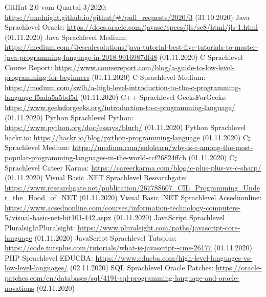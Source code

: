 \documentclass[ngerman]{article}
\begin{document}
\begin{thebibliography}{9}
        GitHut 2.0 vom Quartal 3/2020: \url{https://madnight.github.io/githut/#/pull_requests/2020/3} (31.10.2020)
        Java Sprachlevel Oracle: \url{https://docs.oracle.com/javase/specs/jls/se8/html/jls-1.html} (01.11.2020)
        Java Sprachlevel Medium: \url{https://medium.com/@escalesolutions/java-tutorial-best-five-tutorials-to-master-java-programming-language-in-2018-9916987df48} (01.11.2020)
        C Sprachlevel Course Report: \url{https://www.coursereport.com/blog/a-guide-to-low-level-programming-for-beginners} (01.11.2020)
        C Sprachlevel Medium: \url{https://medium.com/swlh/a-high-level-introduction-to-the-c-programming-language-f5ada5a5bd5d} (01.11.2020)
        C++ Sprachlevel GeeksForGeeks: \url{https://www.geeksforgeeks.org/introduction-to-c-programming-language/} (01.11.2020)
        Python Sprachlevel Python: \url{https://www.python.org/doc/essays/blurb/} (01.11.2020)
        Python Sprachlevel hackr.io: \url{https://hackr.io/blog/python-programming-language} (01.11.2020)
        C$\sharp$ Sprachlevel Medium: \url{https://medium.com/sololearn/why-is-c-among-the-most-popular-programming-languages-in-the-world-ccf26824ffcb} (01.11.2020)
        C$\sharp$ Sprachlevel Cateer Karma: \url{https://careerkarma.com/blog/c-plus-plus-vs-c-sharp/} (01.11.2020)
        Visual Basic .NET Sprachlevel Researchgate: \url{https://www.researchgate.net/publication/267788607_CIL_Programming_Under_the_Hood_of_NET} (01.11.2020)
        Visual Basic .NET Sprachlevel Acseduonline: \url{https://www.acseduonline.com/courses/information-technology-computers-5/visual-basic-net-bit101-442.aspx} (01.11.2020)
        JavaScript Sprachlevel PluralsightPluralsight: \url{https://www.pluralsight.com/paths/javascript-core-language} (01.11.2020)
        JavaScript Sprachlevel Tutsplus: \url{https://code.tutsplus.com/tutorials/what-is-javascript--cms-26177} (01.11.2020)
        PHP Sprachlevel EDUCBA: \url{https://www.educba.com/high-level-languages-vs-low-level-languages/} (02.11.2020)
        SQL Sprachlevel Oracle Patches: \url{https://oracle-patches.com/en/databases/sql/4191-sql-programming-language-and-oracle-novations} (02.11.2020)

\end{thebibliography}
\end{document}
